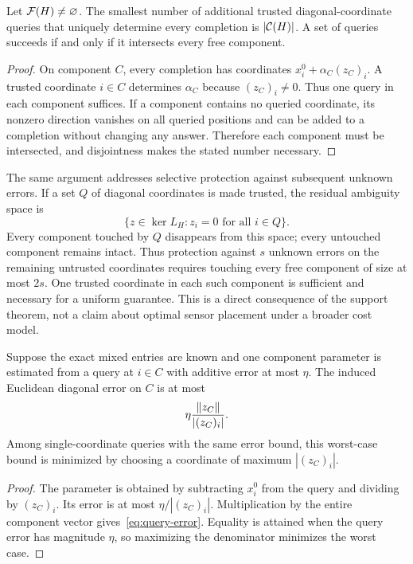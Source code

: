 \begin{proposition}\label{prop:queries}
Let $\mathcal F(H)\ne\varnothing$. The smallest number of additional trusted diagonal-coordinate queries that uniquely determine every completion is $|\mathcal C(H)|$. A set of queries succeeds if and only if it intersects every free component.
\end{proposition}
\begin{proof}
On component $C$, every completion has coordinates $x_i^0+\alpha_C(z_C)_i$. A trusted coordinate $i\in C$ determines $\alpha_C$ because $(z_C)_i\ne0$. Thus one query in each component suffices. If a component contains no queried coordinate, its nonzero direction vanishes on all queried positions and can be added to a completion without changing any answer. Therefore each component must be intersected, and disjointness makes the stated number necessary.
\end{proof}

The same argument addresses selective protection against subsequent unknown errors. If a set $Q$ of diagonal coordinates is made trusted, the residual ambiguity space is
\[
 \{z\in\ker L_H:z_i=0\text{ for all }i\in Q\}.
\]
Every component touched by $Q$ disappears from this space; every untouched component remains intact. Thus protection against $s$ unknown errors on the remaining untrusted coordinates requires touching every free component of size at most $2s$. One trusted coordinate in each such component is sufficient and necessary for a uniform guarantee. This is a direct consequence of the support theorem, not a claim about optimal sensor placement under a broader cost model.

\begin{proposition}\label{prop:query-conditioning}
Suppose the exact mixed entries are known and one component parameter is estimated from a query at $i\in C$ with additive error at most $\eta$. The induced Euclidean diagonal error on $C$ is at most
\begin{equation}\label{eq:query-error}
 \eta\frac{\lVert z_C\rVert}{|(z_C)_i|}.
\end{equation}
Among single-coordinate queries with the same error bound, this worst-case bound is minimized by choosing a coordinate of maximum $|(z_C)_i|$.
\end{proposition}
\begin{samepage}
\begin{proof}
The parameter is obtained by subtracting $x_i^0$ from the query and dividing by $(z_C)_i$. Its error is at most $\eta/|(z_C)_i|$. Multiplication by the entire component vector gives~\eqref{eq:query-error}. Equality is attained when the query error has magnitude $\eta$, so maximizing the denominator minimizes the worst case.
\end{proof}
\par
\end{samepage}


